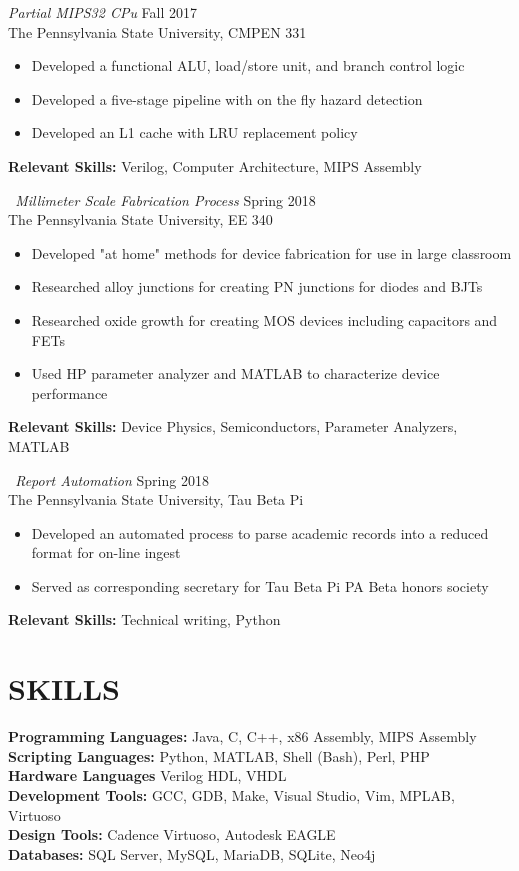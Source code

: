 \documentclass[line,margin]{res}
\begin{document}
\begin{resume}
		{\sl Partial MIPS32 CPu} \hfill Fall 2017\\
		The Pennsylvania State University, CMPEN 331
		\begin{itemize}  \itemsep -2pt
			\item Developed a functional ALU, load/store unit, and branch control logic
			\item Developed a five-stage pipeline with on the fly hazard detection
			\item Developed an L1 cache with LRU replacement policy
			\vspace*{-\baselineskip}		
		\end{itemize}
		\textbf{Relevant Skills:} Verilog, Computer Architecture, MIPS Assembly 
		
		{\sl\ Millimeter Scale Fabrication Process} \hfill Spring 2018\\
		The Pennsylvania State University, EE 340
		\begin{itemize}  \itemsep -2pt
			\item Developed "at home" methods for device fabrication for use in large classroom
			\item Researched alloy junctions for creating PN junctions for diodes and BJTs
			\item Researched oxide growth for creating MOS devices including capacitors and FETs
			\item Used HP parameter analyzer and MATLAB to characterize device performance	
			\vspace*{-\baselineskip}		
		\end{itemize}
		\textbf{Relevant Skills:} Device Physics, Semiconductors, Parameter Analyzers, MATLAB
		
		{\sl\ Report Automation} \hfill Spring 2018\\
		The Pennsylvania State University, Tau Beta Pi
		\begin{itemize}  \itemsep -2pt
			\item Developed an automated process to parse academic records into a reduced format for on-line ingest
			\item Served as corresponding secretary for Tau Beta Pi PA Beta honors society
			\vspace*{-\baselineskip}		
		\end{itemize}
		\textbf{Relevant Skills:} Technical writing, Python
		
		\section{SKILLS}
		\textbf{Programming Languages:} Java, C, C++, x86 Assembly, MIPS Assembly\\
		\textbf{Scripting Languages:} Python, MATLAB, Shell (Bash), Perl, PHP\\
		\textbf{Hardware Languages} Verilog HDL, VHDL\\
		\textbf{Development Tools:} GCC, GDB, Make, Visual Studio, Vim, MPLAB, Virtuoso\\
		\textbf{Design Tools:} Cadence Virtuoso, Autodesk  EAGLE\\
		\textbf{Databases:} SQL Server, MySQL, MariaDB, SQLite, Neo4j
		
	\end{resume}
\end{document}
